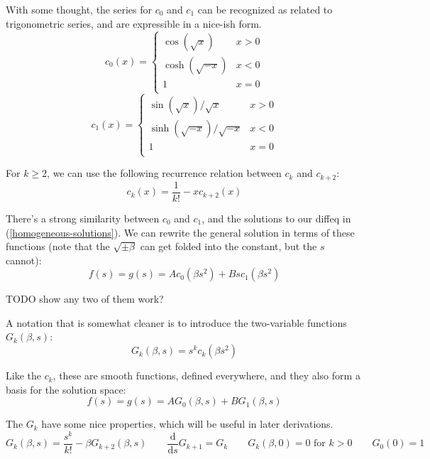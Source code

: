 \documentclass{article}
\newcommand{\dd}{\mathrm{d}}
\newcommand{\der}[2]{\frac{\dd #1}{\dd #2}}
\numberwithin{equation}{subsection}
\begin{document}
With some thought, the series for $c_0$ and $c_1$ can be recognized as related to trigonometric series, and are expressible in a nice-ish form.
\begin{equation}
c_0(x) = \begin{cases}
\cos(\sqrt x)    & x > 0 \\
\cosh(\sqrt{-x}) & x < 0 \\
1                & x = 0 \\
\end{cases}
\end{equation}
\begin{equation}
c_1(x) = \begin{cases}
\sin(\sqrt x) / \sqrt x      & x > 0 \\
\sinh(\sqrt{-x}) / \sqrt{-x} & x < 0 \\
1                            & x = 0 \\
\end{cases}
\end{equation}

For $k \ge 2$, we can use the following recurrence relation between $c_k$ and $c_{k+2}$:
\begin{equation}
c_k(x) = \frac{1}{k!} - x c_{k+2}(x)
\end{equation}

There's a strong similarity between $c_0$ and $c_1$, and the solutions to our diffeq in (\ref{homogeneous-solutions}). We can rewrite the general solution in terms of these functions (note that the $\sqrt{\pm \beta}$ can get folded into the constant, but the $s$ cannot):
\begin{equation}
f(s) = g(s) = A c_0(\beta s^2) + B s c_1(\beta s^2)
\end{equation}

TODO show any two of them work?

A notation that is somewhat cleaner is to introduce the two-variable functions $G_k(\beta, s)$:
\begin{equation}
G_k(\beta, s) = s^k c_k(\beta s^2)
\end{equation}

Like the $c_k$, these are smooth functions, defined everywhere, and they also form a basis for the solution space:
\begin{equation}
f(s) = g(s) = A G_0(\beta, s) + B G_1(\beta, s)
\end{equation}

The $G_k$ have some nice properties, which will be useful in later derivations.
\begin{equation*}
G_k(\beta, s) = \frac{s^k}{k!} - \beta G_{k+2}(\beta, s) \qquad
\der{}{s} G_{k+1} = G_k \qquad G_k(\beta, 0) = 0 \textrm{ for } k > 0 \qquad G_0(0) = 1
\end{equation*}
\end{document}
